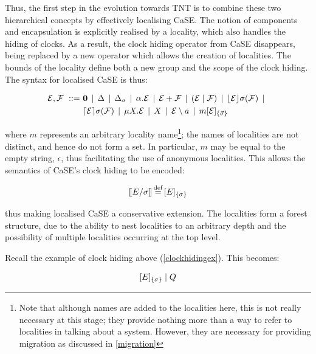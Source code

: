 Thus, the first step in the evolution towards TNT is to combine these
two hierarchical concepts by effectively localising CaSE.  The notion of
components and encapsulation is explicitly realised by a locality, which
also handles the hiding of clocks.  As a result, the clock hiding
operator from CaSE disappears, being replaced by a new operator which
allows the creation of localities.  The bounds of the locality define
both a new group and the scope of the clock hiding.  The syntax for
localised CaSE is thus:

\begin{equation}
  \begin{aligned}
    \text{$\mathcal{E}$}, \text{$\mathcal{F}$}\ ::=\ &
    \textbf{0}  \;\,|\,\; 
    \Delta \;\,|\,\; 
    \Delta_{\sigma} \;\,|\,\; 
    \alpha . \text{$\mathcal{E}$}  \;\,|\,\;
    \text{$\mathcal{E}$} + \text{$\mathcal{F}$} \;\,|\,\; 
    (\text{$\mathcal{E}$}\;|\;\text{$\mathcal{F}$})\;\,|\,\; 
    \lfloor{\text{$\mathcal{E}$}}\rfloor {\sigma} ({\text{$\mathcal{F}$}}) \;\,|\,\; \\
    & \lceil{\text{$\mathcal{E}$}}\rceil {\sigma} ({\text{$\mathcal{F}$}}) \;\,|\,\; 
    \mu X . \text{$\mathcal{E}$} \;\,|\,\; 
    X \;\,|\,\; 
    \text{$\mathcal{E}$} \setminus a \;\,|\,\; 
    {m}[ \text{$\mathcal{E}$} ]_{\{\vec{\sigma}\}}
  \end{aligned}
\end{equation}

\noindent where $m$ represents an arbitrary locality name\footnote{Note
that although names are added to the localities here, this is not really
necessary at this stage; they provide nothing more than a way to refer
to localities in talking about a system.  However, they are necessary
for providing migration as discussed in \ref{migration}}; the names of
localities are not distinct, and hence do not form a set.  In
particular, $m$ may be equal to the empty string, $\epsilon$, thus
facilitating the use of anonymous localities.  This allows the semantics
of CaSE's clock hiding to be encoded:

\begin{equation}
[\hspace{-0.3ex}[ E / \sigma ]\hspace{-0.3ex}] \operatorname{\stackrel{\textrm{def}}{=}} {}[ E ]_{\{\sigma\}}
\end{equation}

\noindent thus making localised CaSE a conservative extension.  The
localities form a forest structure, due to the ability to nest
localities to an arbitrary depth and the possibility of multiple
localities occurring at the top level.

Recall the example of clock hiding above (\ref{clockhidingex}).  This
becomes:

\begin{equation}
  {}[ E ]_{\{\sigma\}}\;|\;Q
\end{equation}

